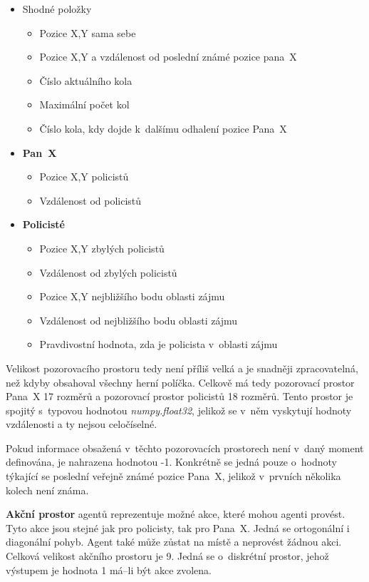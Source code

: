 \begin{itemize}
  \item Shodné položky
    \begin{itemize}
    \item Pozice X,Y sama sebe
    \item Pozice X,Y a vzdálenost od poslední známé pozice pana~X
    \item Číslo aktuálního kola
    \item Maximální počet kol
    \item Číslo kola, kdy dojde k~dalšímu odhalení pozice Pana~X
  \end{itemize}
  \item \textbf{Pan~X}
    \begin{itemize}
    \item Pozice X,Y policistů
    \item Vzdálenost od  policistů
  \end{itemize}
  \item \textbf{Policisté}
    \begin{itemize}
    \item Pozice X,Y zbylých policistů
    \item Vzdálenost od zbylých policistů
    \item Pozice X,Y nejbližšího bodu oblasti zájmu
    \item Vzdálenost od nejbližšího bodu oblasti zájmu
    \item Pravdivostní hodnota, zda je policista v~oblasti zájmu
  \end{itemize}
\end{itemize}

Velikost pozorovacího prostoru tedy není příliš velká a je snadněji zpracovatelná, než kdyby obsahoval všechny herní políčka.
Celkově má tedy pozorovací prostor Pana~X 17 rozměrů a pozorovací prostor policistů 18 rozměrů.
Tento prostor je spojitý s~typovou hodnotou \emph{numpy.float32}, jelikož se v~něm vyskytují hodnoty vzdálenosti a ty nejsou celočíselné.

Pokud informace obsažená v~těchto pozorovacích prostorech není v~daný moment definována, je nahrazena hodnotou -1.
Konkrétně se jedná pouze o~hodnoty týkající se poslední veřejně známé pozice Pana~X, jelikož v~prvních několika kolech není známa.

\bigskip

\textbf{Akční prostor} agentů reprezentuje možné akce, které mohou agenti provést.
Tyto akce jsou stejné jak pro policisty, tak pro Pana~X\@.
Jedná se ortogonální i diagonální pohyb.
Agent také může zůstat na místě a neprovést žádnou akci.
Celková velikost akčního prostoru je 9.
Jedná se o~diskrétní prostor, jehož výstupem je hodnota 1 má--li být akce zvolena.

